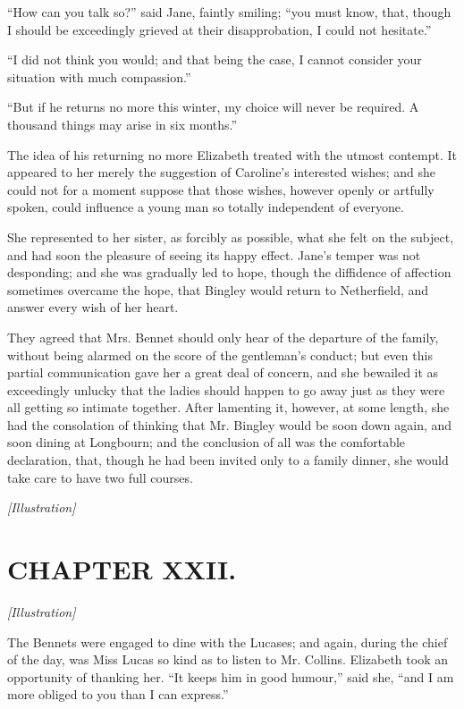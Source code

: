 \documentclass[12pt]{book}
\begin{document}
``How can you talk so?'' said Jane, faintly smiling; ``you must know, that, though I should be exceedingly grieved at their disapprobation, I could not hesitate.''

``I did not think you would; and that being the case, I cannot consider your situation with much compassion.''

``But if he returns no more this winter, my choice will never be required. A thousand things may arise in six months.''

The idea of his returning no more Elizabeth treated with the utmost contempt. It appeared to her merely the suggestion of Caroline's interested wishes; and she could not for a moment suppose that those wishes, however openly or artfully spoken, could influence a young man so totally independent of everyone.

She represented to her sister, as forcibly as possible, what she felt on the subject, and had soon the pleasure of seeing its happy effect. Jane's temper was not desponding; and she was gradually led to hope, though the diffidence of affection sometimes overcame the hope, that Bingley would return to Netherfield, and answer every wish of her heart.

They agreed that Mrs. Bennet should only hear of the departure of the family, without being alarmed on the score of the gentleman's conduct; but even this partial communication gave her a great deal of concern, and she bewailed it as exceedingly unlucky that the ladies should happen to go away just as they were all getting so intimate together. After lamenting it, however, at some length, she had the consolation of thinking that Mr. Bingley would be soon down again, and soon dining at Longbourn; and the conclusion of all was the comfortable declaration, that, though he had been invited only to a family dinner, she would take care to have two full courses.

\emph{[Illustration]}

\chapter{CHAPTER XXII.}

\emph{[Illustration]}

The Bennets were engaged to dine with the Lucases; and again, during the chief of the day, was Miss Lucas so kind as to listen to Mr. Collins. Elizabeth took an opportunity of thanking her. ``It keeps him in good humour,'' said she, ``and I am more obliged to you than I can express.''
\end{document}
